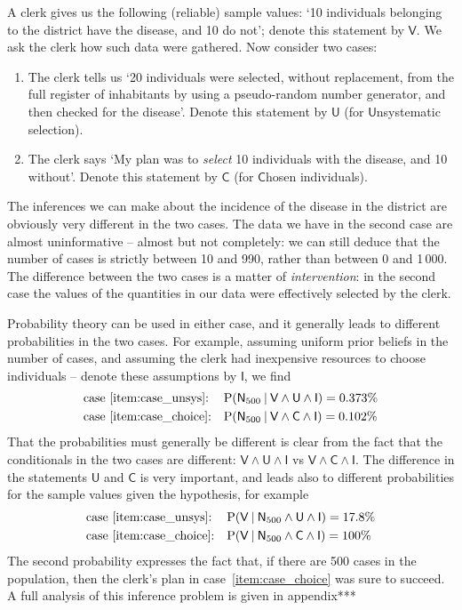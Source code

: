 \documentclass[\ifafour a4paper,12pt,\else a5paper,10pt,\fi%
onecolumn,oneside,article,%
british%
]{memoir}
\theoremstyle{remark}
\theoremstyle{innote}
\renewcommand*{\P}{\mathrm{P}}%
\renewcommand*{\|}[1][]{\nonscript\:#1\vert\nonscript\:\mathopen{}}
\renewcommand*{\=}{\TextOrMath\texteq\eq}
\newcommand*{\yV}{\mathsf{V}}
\newcommand*{\yU}{\mathsf{U}}
\newcommand*{\yC}{\mathsf{C}}
\newcommand*{\yN}{\mathsf{N}}
\newcommand*{\yI}{\mathsf{I}}
\newcommand*{\stat}[1]{`#1'}
\begin{document}
A clerk gives us the following (reliable) sample values: \stat{10
  individuals belonging to the district have the disease, and 10 do not};
denote this statement by $\yV$. We ask the clerk how such data were
gathered. Now consider two cases:
\begin{enumerate}[label=(\roman*)]
\item\label{item:case_unsys} The clerk tells us \stat{20 individuals were
    selected, without replacement, from the full register of inhabitants by
    using a pseudo-random number generator, and then checked for the
    disease}. Denote this statement by $\yU$ (for $\yU$nsystematic
  selection).
\item\label{item:case_choice} The clerk says \stat{My plan was to
    \emph{select} 10 individuals with the disease, and 10 without}. Denote
  this statement by $\yC$ (for $\yC$hosen individuals).
\end{enumerate}

The inferences we can make about the incidence of the disease in the
district are obviously very different in the two cases. The data we have in
the second case are almost uninformative -- almost but not completely: we
can still deduce that the number of cases is strictly between 10 and 990,
rather than between 0 and 1\,000. The difference between the two cases is a
matter of \emph{intervention}: in the second case the values of the
quantities in our data were effectively selected by the clerk.

Probability theory can be used in either case, and it generally leads to
different probabilities in the two cases. For example, assuming uniform
prior beliefs in the number of cases, and assuming the clerk had
inexpensive resources to choose individuals -- denote these assumptions by
$\yI$, we find
\begin{align}
  \label{eq:prob_case_i}
&\text{case~\ref{item:case_unsys}:}&&  \P(\yN_{500} \| \yV \land \yU \land \yI) = 0.373\%
\\
  \label{eq:prob_case_ii}
&\text{case~\ref{item:case_choice}:}&&  \P(\yN_{500} \| \yV \land \yC \land \yI) = 0.102\%
\end{align}
That the probabilities must generally be different is clear from the fact
that the conditionals in the two cases are different: $\yV \land \yU \land
\yI$ vs $\yV \land \yC \land \yI$. The difference in the statements $\yU$
and $\yC$ is very important, and leads also to different probabilities for
the sample values given the hypothesis, for example
\begin{align}
  \label{eq:ll_case_i}
&\text{case~\ref{item:case_unsys}:}&&  \P(\yV \| \yN_{500} \land \yU \land \yI) = 17.8\%
\\
  \label{eq:ll_case_ii}
&\text{case~\ref{item:case_choice}:}&&  \P(\yV \| \yN_{500} \land \yC \land \yI) = 100\%
\end{align}
The second probability expresses the fact that, if there are 500 cases in
the population, then the clerk's plan in case~\ref{item:case_choice} was
sure to succeed. A full analysis of this inference problem is given in appendix***
\end{document}
